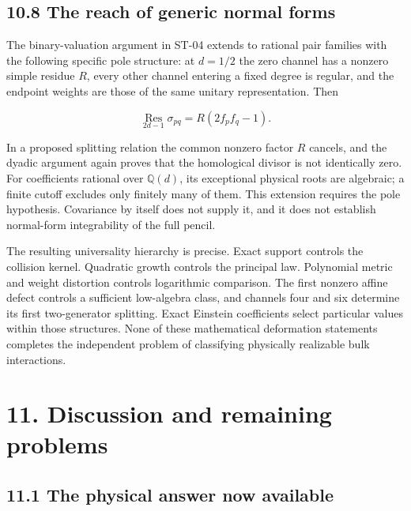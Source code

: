 \documentclass[a4paper,11pt]{article}
\numberwithin{equation}{section}
\begin{document}
\hypertarget{the-reach-of-generic-normal-forms}{%
\subsection{10.8 The reach of generic normal forms}\label{the-reach-of-generic-normal-forms}}

The binary-valuation argument in ST-04 extends to rational pair families with the following specific pole structure: at \(d=1/2\) the zero channel has a nonzero simple residue \(R\), every other channel entering a fixed degree is regular, and the endpoint weights are those of the same unitary representation. Then

\[
\operatorname*{Res}_{2d-1}\sigma_{pq}
=R(2f_pf_q-1).
\]

In a proposed splitting relation the common nonzero factor \(R\) cancels, and the dyadic argument again proves that the homological divisor is not identically zero. For coefficients rational over \(\mathbb Q(d)\), its exceptional physical roots are algebraic; a finite cutoff excludes only finitely many of them. This extension requires the pole hypothesis. Covariance by itself does not supply it, and it does not establish normal-form integrability of the full pencil.

The resulting universality hierarchy is precise. Exact support controls the collision kernel. Quadratic growth controls the principal law. Polynomial metric and weight distortion controls logarithmic comparison. The first nonzero affine defect controls a sufficient low-algebra class, and channels four and six determine its first two-generator splitting. Exact Einstein coefficients select particular values within those structures. None of these mathematical deformation statements completes the independent problem of classifying physically realizable bulk interactions.

\clearpage
\hypertarget{discussion-and-remaining-problems}{%
\section{11. Discussion and remaining problems}\label{discussion-and-remaining-problems}}

\hypertarget{the-physical-answer-now-available}{%
\subsection{11.1 The physical answer now available}\label{the-physical-answer-now-available}}
\end{document}
